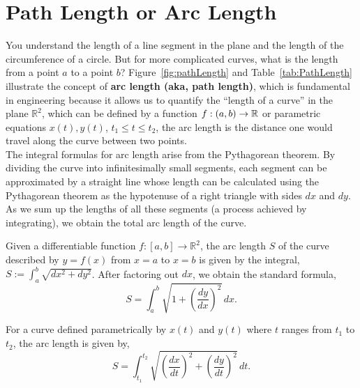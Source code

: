 \section{Path Length or Arc Length}

You understand the length of a line segment in the plane and the length of the circumference of a circle. But for more complicated curves, what is the length from a point $a$ to a point $b$? Figure~\ref{fig:pathLength} and Table~\ref{tab:PathLength} illustrate the concept of \textbf{arc length (aka, path length)}, which is fundamental in engineering because it allows us to quantify the ``length of a curve'' in the plane \( \mathbb{R}^2 \), which can be defined by a function \( f:(a, b) \to \mathbb R \) or parametric equations \( x(t), y(t) \), $t_1 \le t \le t_2$, the arc length is the distance one would travel along the curve between two points.\\

The integral formulas for arc length arise from the Pythagorean theorem. By dividing the curve into infinitesimally small segments, each segment can be approximated by a straight line whose length can be calculated using the Pythagorean theorem as the hypotenuse of a right triangle with sides \( dx \) and \( dy \). As we sum up the lengths of all these segments (a process achieved by integrating), we obtain the total arc length of the curve.



\bigskip

\begin{tcolorbox}[colback=mylightblue, title = {\bf Arc Length = Path Length}, breakable]

\begin{definition} 
\label{def:pathLength} Given a differentiable function \( f : [a, b] \rightarrow \mathbb{R}^2 \), the arc length \( S \) of the curve described by \( y = f(x) \) from \( x=a \) to \( x=b \) is given by the integral, $S:=\int_a^b \sqrt{dx^2 + dy^2}$. After factoring out $dx$, we obtain the standard formula,
\begin{equation}
\label{eq:arclengthFunction}
S = \int_{a}^{b} \sqrt{1 + \left(\frac{dy}{dx}\right)^2} \, dx.
\end{equation}

For a curve defined parametrically by \( x(t) \) and \( y(t) \) where \( t \) ranges from \( t_1 \) to \( t_2 \), the arc length is given by, 
\begin{equation}
\label{eq:arclengthParametricPath}
S = \int_{t_1}^{t_2} \sqrt{\left(\frac{dx}{dt}\right)^2 + \left(\frac{dy}{dt}\right)^2} \, dt.
\end{equation}
\end{definition}
\end{tcolorbox}

